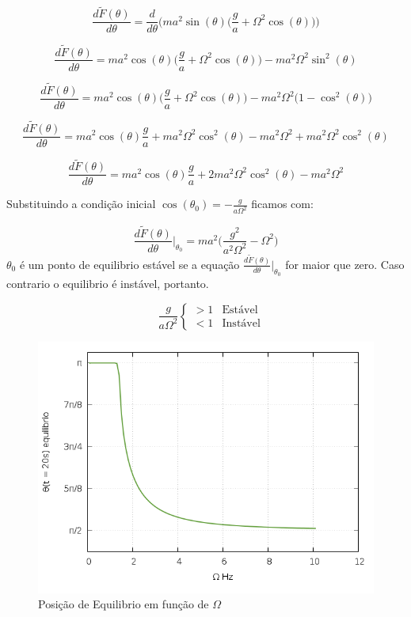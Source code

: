 \documentclass[a4paper,11pt]{exam}
\begin{document}
\begin{itemize}
	\[ \frac{d \tilde F(\theta)}{d\theta} =\frac{d}{d\theta} \Bigg( ma^2\sin(\theta)\Big( \frac{g}{a} + \Omega^2 \cos(\theta) \Big) \Bigg) \]
	
	\[ \frac{d \tilde F(\theta)}{d\theta} = ma^2\cos(\theta) \Big( \frac{g}{a} + \Omega^2 \cos(\theta) \Big) - ma^2\Omega^2 \sin^2(\theta) \]
	
	\[ \frac{d \tilde F(\theta)}{d\theta} = ma^2\cos(\theta) \Big( \frac{g}{a} + \Omega^2 \cos(\theta) \Big) - ma^2\Omega^2 \Big( 1 - \cos^2(\theta) \Big) \]
	
	\[ \frac{d \tilde F(\theta)}{d\theta} = ma^2\cos(\theta)\frac{g}{a} + ma^2\Omega^2 \cos^2(\theta) - ma^2\Omega^2 + ma^2\Omega^2\cos^2(\theta) \]
	
	\[ \frac{d \tilde F(\theta)}{d\theta} = ma^2\cos(\theta)\frac{g}{a} + 2ma^2\Omega^2 \cos^2(\theta) - ma^2\Omega^2 \]
	
	Substituindo a condição inicial $\cos(\theta_0) = - \frac{g}{a\Omega^2}$ ficamos com:
	
	\[ \frac{d \tilde F(\theta)}{d\theta} \Bigg|_{\theta_{0}} = ma^2 \Big( \frac{g^2}{a^2\Omega^2} - \Omega^2 \Big) \]
	$\theta_0$ é um ponto de equilibrio estável se a equação $\frac{d \tilde F(\theta)}{d\theta} \Bigg|_{\theta_{0}}$ for maior que zero. Caso contrario o equilibrio é instável, portanto.
	
	\[ \quad \frac{g}{a\Omega^2}
	\begin{cases}
	 	 > 1 & \text{Estável} \\ 
	 	 < 1 & \text{Instável} 
	 \end{cases}
	\]
	\begin{figure}[h]
			\centering
			\includegraphics[scale=0.5]{Gr4.png}
			\caption{Posição de Equilibrio em função de $\Omega$}
		\end{figure}
	\end{itemize}
	
\end{document}
